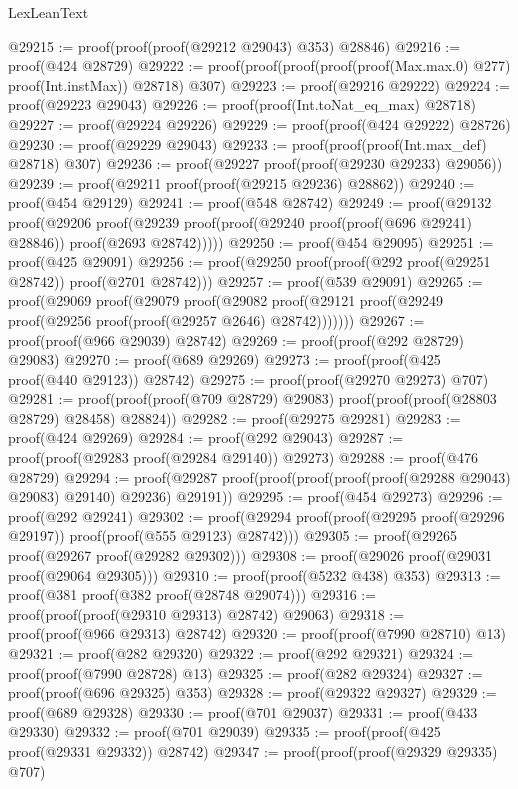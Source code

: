 \begin{lexlean}{LexLeanText}
\begin{coremodule}
@29215 := proof(proof(proof(@29212 @29043) @353) @28846)
@29216 := proof(@424 @28729)
@29222 := proof(proof(proof(proof(proof(Max.max.{0}) @277) proof(Int.instMax)) @28718) @307)
@29223 := proof(@29216 @29222)
@29224 := proof(@29223 @29043)
@29226 := proof(proof(Int.toNat_eq_max) @28718)
@29227 := proof(@29224 @29226)
@29229 := proof(proof(@424 @29222) @28726)
@29230 := proof(@29229 @29043)
@29233 := proof(proof(proof(Int.max_def) @28718) @307)
@29236 := proof(@29227 proof(proof(@29230 @29233) @29056))
@29239 := proof(@29211 proof(proof(@29215 @29236) @28862))
@29240 := proof(@454 @29129)
@29241 := proof(@548 @28742)
@29249 := proof(@29132
      proof(@29206
          proof(@29239 proof(proof(@29240 proof(proof(@696 @29241) @28846)) proof(@2693 @28742)))))
@29250 := proof(@454 @29095)
@29251 := proof(@425 @29091)
@29256 := proof(@29250 proof(proof(@292 proof(@29251 @28742)) proof(@2701 @28742)))
@29257 := proof(@539 @29091)
@29265 := proof(@29069
      proof(@29079
          proof(@29082
              proof(@29121 proof(@29249 proof(@29256 proof(proof(@29257 @2646) @28742)))))))
@29267 := proof(proof(@966 @29039) @28742)
@29269 := proof(proof(@292 @28729) @29083)
@29270 := proof(@689 @29269)
@29273 := proof(proof(@425 proof(@440 @29123)) @28742)
@29275 := proof(proof(@29270 @29273) @707)
@29281 := proof(proof(proof(@709 @28729) @29083) proof(proof(proof(@28803 @28729) @28458) @28824))
@29282 := proof(@29275 @29281)
@29283 := proof(@424 @29269)
@29284 := proof(@292 @29043)
@29287 := proof(proof(@29283 proof(@29284 @29140)) @29273)
@29288 := proof(@476 @28729)
@29294 := proof(@29287 proof(proof(proof(proof(proof(@29288 @29043) @29083) @29140) @29236) @29191))
@29295 := proof(@454 @29273)
@29296 := proof(@292 @29241)
@29302 := proof(@29294 proof(proof(@29295 proof(@29296 @29197)) proof(proof(@555 @29123) @28742)))
@29305 := proof(@29265 proof(@29267 proof(@29282 @29302)))
@29308 := proof(@29026 proof(@29031 proof(@29064 @29305)))
@29310 := proof(proof(@5232 @438) @353)
@29313 := proof(@381 proof(@382 proof(@28748 @29074)))
@29316 := proof(proof(proof(@29310 @29313) @28742) @29063)
@29318 := proof(proof(@966 @29313) @28742)
@29320 := proof(proof(@7990 @28710) @13)
@29321 := proof(@282 @29320)
@29322 := proof(@292 @29321)
@29324 := proof(proof(@7990 @28728) @13)
@29325 := proof(@282 @29324)
@29327 := proof(proof(@696 @29325) @353)
@29328 := proof(@29322 @29327)
@29329 := proof(@689 @29328)
@29330 := proof(@701 @29037)
@29331 := proof(@433 @29330)
@29332 := proof(@701 @29039)
@29335 := proof(proof(@425 proof(@29331 @29332)) @28742)
@29347 := proof(proof(proof(@29329 @29335) @707)

\end{coremodule}
\end{lexlean}
